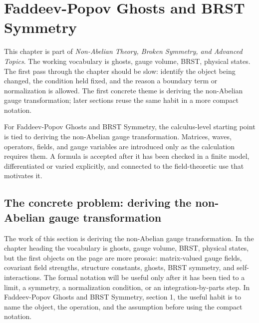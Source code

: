 \chapter{Faddeev-Popov Ghosts and BRST Symmetry}


This chapter is part of \emph{Non-Abelian Theory, Broken Symmetry, and Advanced Topics}.  The working vocabulary is ghosts, gauge volume, BRST, physical states.  The first pass through the chapter should be slow: identify the object being changed, the condition held fixed, and the reason a boundary term or normalization is allowed.  The first concrete theme is deriving the non-Abelian gauge transformation; later sections reuse the same habit in a more compact notation.

For Faddeev-Popov Ghosts and BRST Symmetry, the calculus-level starting point is tied to deriving the non-Abelian gauge transformation.  Matrices, waves, operators, fields, and gauge variables are introduced only as the calculation requires them.  A formula is accepted after it has been checked in a finite model, differentiated or varied explicitly, and connected to the field-theoretic use that motivates it.

\section{The concrete problem: deriving the non-Abelian gauge transformation}













The work of this section is deriving the non-Abelian gauge transformation.  In the chapter heading the vocabulary is ghosts, gauge volume, BRST, physical states, but the first objects on the page are more prosaic: matrix-valued gauge fields, covariant field strengths, structure constants, ghosts, BRST symmetry, and self-interactions.  The formal notation will be useful only after it has been tied to a limit, a symmetry, a normalization condition, or an integration-by-parts step.  In Faddeev-Popov Ghosts and BRST Symmetry, section 1, the useful habit is to name the object, the operation, and the assumption before using the compact notation.

